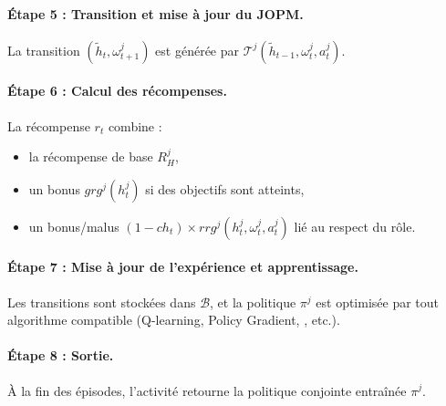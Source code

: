 \paragraph{Étape 5 : Transition et mise à jour du JOPM.}
La transition $(\tilde{h}_t,\omega_{t+1}^j)$ est générée par $\mathcal{T}^j(\tilde{h}_{t-1},\omega_t^j,a_t^j)$.

\paragraph{Étape 6 : Calcul des récompenses.}
La récompense $r_t$ combine :
\begin{itemize}
  \item la récompense de base $R^j_H$,
  \item un bonus $grg^j(h^j_t)$ si des objectifs sont atteints,
  \item un bonus/malus $(1-ch_t)\times rrg^j(h^j_t,\omega_t^j,a_t^j)$ lié au respect du rôle.
\end{itemize}

\paragraph{Étape 7 : Mise à jour de l'expérience et apprentissage.}
Les transitions sont stockées dans $\mathcal{B}$, et la politique $\pi^j$ est optimisée par tout algorithme  compatible (Q-learning, Policy Gradient, , etc.).

\paragraph{Étape 8 : Sortie.}
À la fin des épisodes, l'activité retourne la politique conjointe entraînée $\pi^j$.


